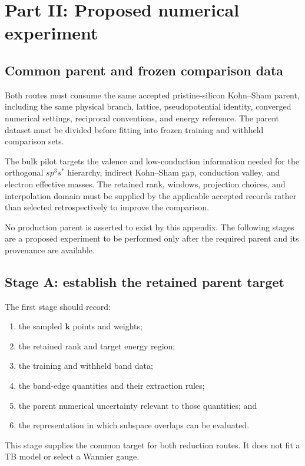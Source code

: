 \section{Part II: Proposed numerical experiment}

\subsection{Common parent and frozen comparison data}

Both routes must consume the same accepted pristine-silicon Kohn--Sham parent,
including the same physical branch, lattice, pseudopotential identity,
converged numerical settings, reciprocal conventions, and energy reference.
The parent dataset must be divided before fitting into frozen training and
withheld comparison sets.

The bulk pilot targets the valence and low-conduction information needed for
the orthogonal $sp^3s^{\ast}$ hierarchy, indirect Kohn--Sham gap, conduction
valley, and electron effective masses. The retained rank, windows, projection
choices, and interpolation domain must be supplied by the applicable accepted
records rather than selected retrospectively to improve the comparison.

No production parent is asserted to exist by this appendix. The following stages
are a proposed experiment to be performed only after the required parent and
its provenance are available.

\subsection{Stage A: establish the retained parent target}

The first stage should record:
\begin{enumerate}
    \item the sampled $\mathbf k$ points and weights;
    \item the retained rank and target energy region;
    \item the training and withheld band data;
    \item the band-edge quantities and their extraction rules;
    \item the parent numerical uncertainty relevant to those quantities; and
    \item the representation in which subspace overlaps can be evaluated.
\end{enumerate}
This stage supplies the common target for both reduction routes. It does not
fit a TB model or select a Wannier gauge.


